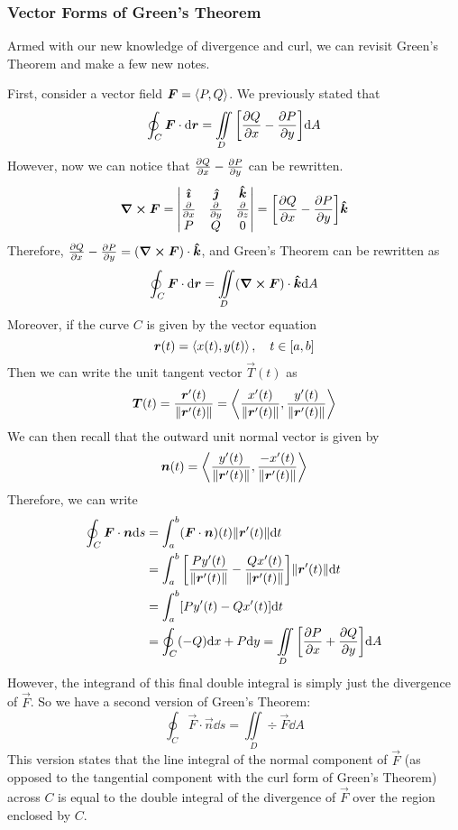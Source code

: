 \subsubsection{Vector Forms of Green's Theorem}
Armed with our new knowledge of divergence and curl, we can revisit Green's Theorem and make a few new notes. \par
First, consider a vector field $\boldsymbol{F} = \left\langle P, Q\right\rangle$. We previously stated that
\[ \oint_C \vec F \cdot \dd \vec r = \iint\limits_D \bqty{\pdv{Q}{x}-\pdv{P}{y}}\dd A\]
However, now we can notice that $\pdv{Q}{x} - \pdv{P}{y}$ can be rewritten. 
\begin{align*}
    \curl \vec F = \curlmatrix{P}{Q}{0} = \bqty{\pdv{Q}{x} - \pdv{P}{y}}\khat
\end{align*}
Therefore, $\pdv{Q}{x}-\pdv{P}{y} = (\curl \boldsymbol{F})\cdot \boldsymbol{\hat{k}}$, and Green's Theorem can be rewritten as 
\[ \oint_C\boldsymbol{F} \cdot \dd \boldsymbol{r} = \iint\limits_D (\curl \boldsymbol{F})\cdot \boldsymbol{\hat{k}} \dd A\]
Moreover, if the curve $C$ is given by the vector equation 
\[ \boldsymbol{r}(t) = \left\langle x(t), y(t)\right\rangle, \quad t\in[a,b]\]
Then we can write the unit tangent vector $\vec T(t)$ as
\[ \boldsymbol{T}(t) = \frac{\boldsymbol{r}'(t)}{\norm{\boldsymbol{r}'(t)}} = \left\langle \frac{x'(t)}{\norm{\boldsymbol{r}'(t)}}, \frac{y'(t)}{\norm{\boldsymbol{r}'(t)}}\right\rangle \]
We can then recall that the outward unit normal vector is given by 
\[ \boldsymbol{n}(t) = \left\langle \frac{y'(t)}{\norm{\boldsymbol{r}'(t)}}, \frac{-x'(t)}{\norm{\boldsymbol{r}'(t)}}\right\rangle\]
Therefore, we can write
\begin{align*}
    \oint_C \vec F \cdot \vec n \dd s &= \int_a^b (\vec F \cdot \vec n)(t)\norm{\vec r'(t)}\dd t \\
    &= \int_a^b \bqty{\frac{Py'(t)}{\norm {\vec r'(t)}} -\frac{Qx'(t)}{\norm{\vec r'(t)}}}\norm{\vec r'(t)}\dd t \\
    &= \int_a^b [Py'(t) - Qx'(t)]\dd t \\
    &= \oint_C (-Q)\dd x + P\dd y = \iint\limits_D \bqty{\pdv{P}{x}+\pdv{Q}{y}}\dd A
\end{align*}
However, the integrand of this final double integral is simply just the divergence of $\vec F$. So we have a second version of Green's Theorem:
\[ \oint_C \vec F \cdot \vec n \dd s = \iint\limits_D \div \vec F \dd A\]
This version states that the line integral of the normal component of $\vec F$ (as opposed to the tangential component with the curl form of Green's Theorem) across $C$ is equal to the double integral of the divergence of $\vec F$ over the region enclosed by $C$.
